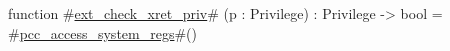 function #\hyperref[sailRISCVzextzycheckzyxretzypriv]{ext\_check\_xret\_priv}# (p : Privilege) : Privilege -> bool =
  #\hyperref[sailRISCVzpcczyaccesszysystemzyregs]{pcc\_access\_system\_regs}#()
